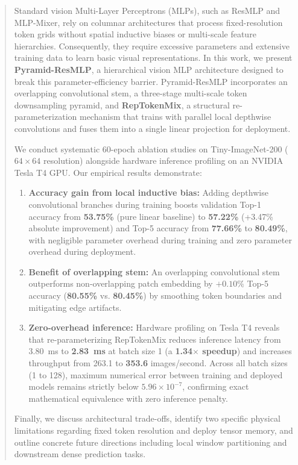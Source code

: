 \begin{abstract}
Standard vision Multi-Layer Perceptrons (MLPs), such as ResMLP and MLP-Mixer, rely on columnar architectures that process fixed-resolution token grids without spatial inductive biases or multi-scale feature hierarchies. Consequently, they require excessive parameters and extensive training data to learn basic visual representations. In this work, we present \textbf{Pyramid-ResMLP}, a hierarchical vision MLP architecture designed to break this parameter-efficiency barrier. Pyramid-ResMLP incorporates an overlapping convolutional stem, a three-stage multi-scale token downsampling pyramid, and \textbf{RepTokenMix}, a structural re-parameterization mechanism that trains with parallel local depthwise convolutions and fuses them into a single linear projection for deployment.

We conduct systematic 60-epoch ablation studies on Tiny-ImageNet-200 ($64 \times 64$ resolution) alongside hardware inference profiling on an NVIDIA Tesla T4 GPU. Our empirical results demonstrate:
\begin{enumerate}
    \item \textbf{Accuracy gain from local inductive bias:} Adding depthwise convolutional branches during training boosts validation Top-1 accuracy from \textbf{53.75\%} (pure linear baseline) to \textbf{57.22\%} (+3.47\% absolute improvement) and Top-5 accuracy from \textbf{77.66\%} to \textbf{80.49\%}, with negligible parameter overhead during training and zero parameter overhead during deployment.
    \item \textbf{Benefit of overlapping stem:} An overlapping convolutional stem outperforms non-overlapping patch embedding by $+0.10\%$ Top-5 accuracy (\textbf{80.55\%} vs. \textbf{80.45\%}) by smoothing token boundaries and mitigating edge artifacts.
    \item \textbf{Zero-overhead inference:} Hardware profiling on Tesla T4 reveals that re-parameterizing RepTokenMix reduces inference latency from 3.80~ms to \textbf{2.83~ms} at batch size 1 (a \textbf{1.34$\times$ speedup}) and increases throughput from 263.1 to \textbf{353.6} images/second. Across all batch sizes (1 to 128), maximum numerical error between training and deployed models remains strictly below $5.96 \times 10^{-7}$, confirming exact mathematical equivalence with zero inference penalty.
\end{enumerate}
Finally, we discuss architectural trade-offs, identify two specific physical limitations regarding fixed token resolution and deploy tensor memory, and outline concrete future directions including local window partitioning and downstream dense prediction tasks.
\end{abstract}
